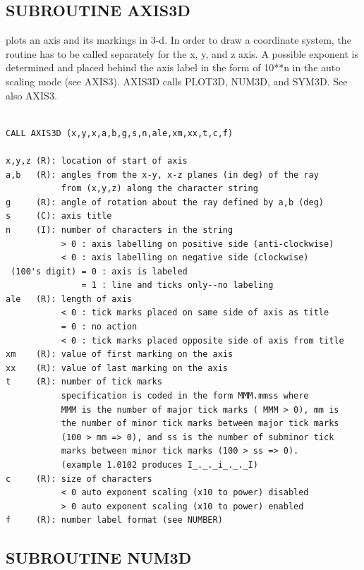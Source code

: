 \documentclass[11pt]{report}
\begin{document}
\subsection{SUBROUTINE AXIS3D}

 plots an axis and its markings in 3-d.  In order to draw a 
coordinate system, the routine has to be called separately for the x,
y, and z axis.  A possible exponent is determined and placed behind the
axis label in the form of 10**n in the auto scaling mode (see AXIS3).
AXIS3D calls PLOT3D, NUM3D, and SYM3D.  See also AXIS3.
\begin{verbatim}

CALL AXIS3D (x,y,x,a,b,g,s,n,ale,xm,xx,t,c,f)

x,y,z (R): location of start of axis 
a,b   (R): angles from the x-y, x-z planes (in deg) of the ray
           from (x,y,z) along the character string 
g     (R): angle of rotation about the ray defined by a,b (deg)
s     (C): axis title
n     (I): number of characters in the string
           > 0 : axis labelling on positive side (anti-clockwise)
           < 0 : axis labelling on negative side (clockwise)
 (100's digit) = 0 : axis is labeled
               = 1 : line and ticks only--no labeling
ale   (R): length of axis 
           < 0 : tick marks placed on same side of axis as title
           = 0 : no action
           < 0 : tick marks placed opposite side of axis from title
xm    (R): value of first marking on the axis
xx    (R): value of last marking on the axis
t     (R): number of tick marks 
           specification is coded in the form MMM.mmss where
           MMM is the number of major tick marks ( MMM > 0), mm is
           the number of minor tick marks between major tick marks
           (100 > mm => 0), and ss is the number of subminor tick
           marks between minor tick marks (100 > ss => 0).
           (example 1.0102 produces I_._._i_._._I)
c     (R): size of characters 
           < 0 auto exponent scaling (x10 to power) disabled
           > 0 auto exponent scaling (x10 to power) enabled
f     (R): number label format (see NUMBER) 
\end{verbatim}

\subsection{SUBROUTINE NUM3D}
\end{document}
